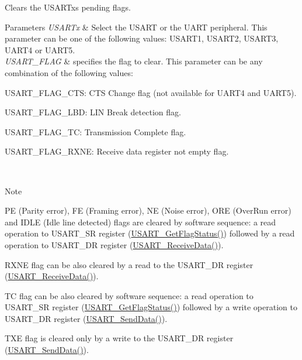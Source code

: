 Clears the U\+S\+A\+R\+Tx\textquotesingle{}s pending flags. 


\begin{DoxyParams}{Parameters}
{\em U\+S\+A\+R\+Tx} & Select the U\+S\+A\+RT or the U\+A\+RT peripheral. This parameter can be one of the following values\+: U\+S\+A\+R\+T1, U\+S\+A\+R\+T2, U\+S\+A\+R\+T3, U\+A\+R\+T4 or U\+A\+R\+T5. \\
\hline
{\em U\+S\+A\+R\+T\+\_\+\+F\+L\+AG} & specifies the flag to clear. This parameter can be any combination of the following values\+: \begin{DoxyItemize}
\item U\+S\+A\+R\+T\+\_\+\+F\+L\+A\+G\+\_\+\+C\+TS\+: C\+TS Change flag (not available for U\+A\+R\+T4 and U\+A\+R\+T5). \item U\+S\+A\+R\+T\+\_\+\+F\+L\+A\+G\+\_\+\+L\+BD\+: L\+IN Break detection flag. \item U\+S\+A\+R\+T\+\_\+\+F\+L\+A\+G\+\_\+\+TC\+: Transmission Complete flag. \item U\+S\+A\+R\+T\+\_\+\+F\+L\+A\+G\+\_\+\+R\+X\+NE\+: Receive data register not empty flag.\end{DoxyItemize}
\\
\hline
\end{DoxyParams}
\begin{DoxyNote}{Note}

\begin{DoxyItemize}
\item PE (Parity error), FE (Framing error), NE (Noise error), O\+RE (Over\+Run error) and I\+D\+LE (Idle line detected) flags are cleared by software sequence\+: a read operation to U\+S\+A\+R\+T\+\_\+\+SR register (\hyperlink{group___u_s_a_r_t___private___functions_ga144630722defc9e312f0ad280b68e9da}{U\+S\+A\+R\+T\+\_\+\+Get\+Flag\+Status()}) followed by a read operation to U\+S\+A\+R\+T\+\_\+\+DR register (\hyperlink{group___u_s_a_r_t___private___functions_gac67a91845b0b1d54d31bdfb1c5e9867c}{U\+S\+A\+R\+T\+\_\+\+Receive\+Data()}).
\item R\+X\+NE flag can be also cleared by a read to the U\+S\+A\+R\+T\+\_\+\+DR register (\hyperlink{group___u_s_a_r_t___private___functions_gac67a91845b0b1d54d31bdfb1c5e9867c}{U\+S\+A\+R\+T\+\_\+\+Receive\+Data()}).
\item TC flag can be also cleared by software sequence\+: a read operation to U\+S\+A\+R\+T\+\_\+\+SR register (\hyperlink{group___u_s_a_r_t___private___functions_ga144630722defc9e312f0ad280b68e9da}{U\+S\+A\+R\+T\+\_\+\+Get\+Flag\+Status()}) followed by a write operation to U\+S\+A\+R\+T\+\_\+\+DR register (\hyperlink{group___u_s_a_r_t___private___functions_ga0b43d42da9540f446d494bf69823c6fb}{U\+S\+A\+R\+T\+\_\+\+Send\+Data()}).
\item T\+XE flag is cleared only by a write to the U\+S\+A\+R\+T\+\_\+\+DR register (\hyperlink{group___u_s_a_r_t___private___functions_ga0b43d42da9540f446d494bf69823c6fb}{U\+S\+A\+R\+T\+\_\+\+Send\+Data()}). 
\end{DoxyItemize}
\end{DoxyNote}

